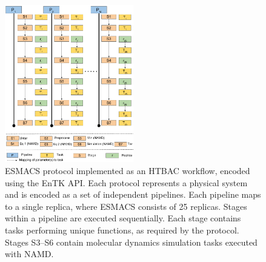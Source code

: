 
\begin{figure}
\centering
  \includegraphics[width=0.5\textwidth]{FIGURES/HTBAC_Workflow_ESMACS.pdf}
  \caption{ESMACS protocol implemented as an HTBAC
  workflow, encoded using the EnTK %
  API. Each protocol
  represents a physical system and is %
  encoded as a set of independent pipelines. Each pipeline maps to a single
  replica, where ESMACS consists of 25 replicas. Stages within a pipeline
  are executed sequentially. Each stage contains tasks  performing unique
  functions, as required by the protocol. Stages S3--S6 contain molecular
  dynamics simulation tasks executed with NAMD\@.}\label{figure:HTBAC}
\end{figure}



